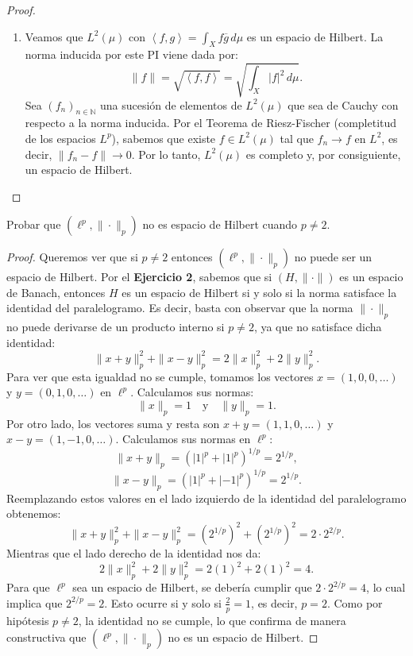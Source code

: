 \documentclass{article}
\theoremstyle{definition}
\newcommand{\N}{\mathbb{N}}
\newcommand{\ip}[2]{\left\langle #1, #2 \right\rangle}   %
\newenvironment{ejercicio}[1]{\begin{trivlist}
\item[\hskip \labelsep {\bfseries Ejercicio}\hskip \labelsep {\bfseries #1.}]}{\end{trivlist}}
\begin{document}
\begin{proof}
\begin{enumerate}
		\item Veamos que \( L^2(\mu) \) con \( \ip{f}{g} = \int_X f \overline{g} \, d\mu \) es un espacio de Hilbert. La norma inducida por este PI viene dada por:
		      \[
			      \| f \| = \sqrt{\ip{f}{f}} = \sqrt{\int_X |f|^2 \, d\mu}.
		      \]
		      Sea \( {(f_n)}_{n \in \N} \) una sucesión de elementos de \( L^2(\mu) \) que sea de Cauchy con respecto a la norma inducida. Por el Teorema de Riesz-Fischer (completitud de los espacios \(L^p\)), sabemos que existe \( f \in L^2(\mu) \) tal que \( f_n \to f \) en \( L^2 \), es decir, \( \| f_n - f \| \to 0 \). Por lo tanto, \( L^2(\mu) \) es completo y, por consiguiente, un espacio de Hilbert.
	\end{enumerate}
\end{proof}

\vspace{0.5cm}

\begin{ejercicio}{5}
	Probar que \( (\ell^p, \| \cdot \|_p) \) no es espacio de Hilbert cuando \( p \neq 2 \).
\end{ejercicio}
\begin{proof}
	Queremos ver que si \( p \neq 2 \) entonces \( (\ell^p, \| \cdot \|_p) \) no puede ser un espacio de Hilbert.
	Por el \textbf{Ejercicio 2}, sabemos que si \( (H, \| \cdot \|) \) es un espacio de Banach, entonces \( H \) es un espacio de Hilbert si y solo si la norma satisface la identidad del paralelogramo.
	Es decir, basta con observar que la norma \( \| \cdot \|_p \) no puede derivarse de un producto interno si \( p \neq 2 \), ya que no satisface dicha identidad:
	\[
		\| x+y \|_p^2 + \| x-y \|_p^2 = 2 \| x \|_p^2 + 2 \| y \|_p^2.
	\]
	Para ver que esta igualdad no se cumple, tomamos los vectores \( x = (1,0,0,\dots) \) y \( y = (0,1,0,\dots) \) en \( \ell^p \). Calculamos sus normas:
	\[
		\| x \|_p = 1 \quad \text{y} \quad \| y \|_p = 1.
	\]
	Por otro lado, los vectores suma y resta son \( x+y = (1,1,0,\dots) \) y \( x-y = (1,-1,0,\dots) \). Calculamos sus normas en \( \ell^p \):
	\[
		\| x+y \|_p = {\left( |1|^p + |1|^p \right)}^{1/p} = {2}^{1/p},
	\]
	\[
		\| x-y \|_p = {\left( |1|^p + |-1|^p \right)}^{1/p} = 2^{1/p}.
	\]
	Reemplazando estos valores en el lado izquierdo de la identidad del paralelogramo obtenemos:
	\[
		\| x+y \|_p^2 + \| x-y \|_p^2 = {(2^{1/p})}^2 + {(2^{1/p})}^2 = 2 \cdot 2^{2/p}.
	\]
	Mientras que el lado derecho de la identidad nos da:
	\[
		2 \| x \|_p^2 + 2 \| y \|_p^2 = 2{(1)}^2 + 2{(1)}^2 = 4.
	\]
	Para que \( \ell^p \) sea un espacio de Hilbert, se debería cumplir que \( 2 \cdot 2^{2/p} = 4 \), lo cual implica que \( 2^{2/p} = 2 \). Esto ocurre si y solo si \( \frac{2}{p} = 1 \), es decir, \( p = 2 \).
	Como por hipótesis \( p \neq 2 \), la identidad no se cumple, lo que confirma de manera constructiva que \( (\ell^p, \| \cdot \|_p) \) no es un espacio de Hilbert.
\end{proof}
\end{document}
